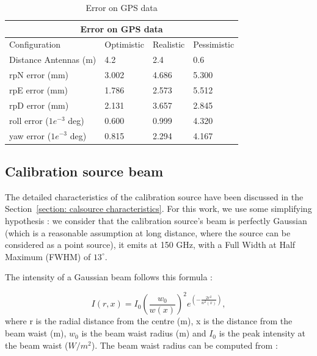 \documentclass[../../thesis.tex]{subfiles}
\begin{document}
\begin{table}[htbp]
    \centering
    \caption{Error on GPS data}
    \label{tab: data error}
    \begin{tabular}{|p{4cm}||p{2cm}|p{2cm}|p{2cm}|}
        \hline
        \multicolumn{4}{|c|}{Error on GPS data}                           \\
        \hline
        Configuration              & Optimistic & Realistic & Pessimistic \\
        \hline
        Distance Antennas (m)      & 4.2        & 2.4       & 0.6         \\
        \hline
        rpN error (mm)             & 3.002      & 4.686     & 5.300       \\
        rpE error (mm)             & 1.786      & 2.573     & 5.512       \\
        rpD error (mm)             & 2.131      & 3.657     & 2.845       \\
        roll error ($1e^{-3}$ deg) & 0.600      & 0.999     & 4.320       \\
        yaw  error ($1e^{-3}$ deg) & 0.815      & 2.294     & 4.167       \\
        \hline
    \end{tabular}
\end{table}

\subsection{Calibration source beam}
The detailed characteristics of the calibration source have been discussed in the Section~\ref{section: calsource characteristics}. For this work, we use some simplifying hypothesis : we consider that the calibration source's beam is perfectly Gaussian (which is a reasonable assumption at long distance, where the source can be considered as a point source), it emits at 150 GHz, with a Full Width at Half Maximum (FWHM) of $13^\circ$.

The intensity of a Gaussian beam follows this formula :

\begin{equation}
    I(r, x) = I_0 (\frac{w_0}{w(x)})^2 e^(-\frac{2r^2}{w^2(x)}),
\end{equation}
where r is the radial distance from the centre (m), x is the distance from the beam waist (m), $w_0$ is the beam waist radius (m) and $I_0$ is the peak intensity at the beam waist ($W/m^2$). The beam waist radius can be computed from :
\end{document}
